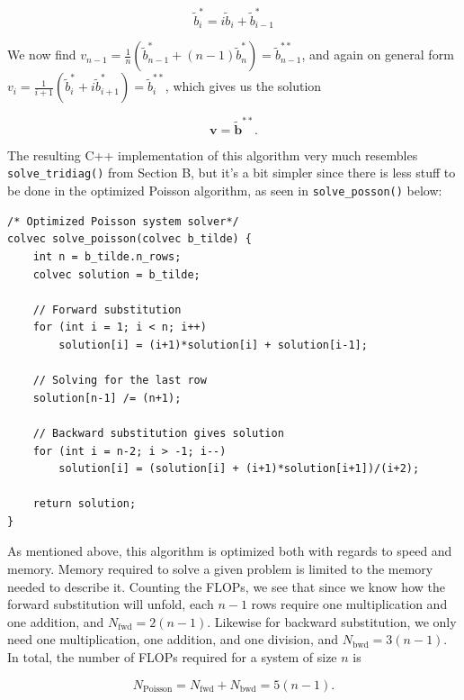 \documentclass[]{article}
\begin{document}
\begin{equation*}
\tilde{b}_{i}^{\ast} = i\tilde{b}_{i} + \tilde{b}_{i-1}^{\ast}
\end{equation*}

We now find $v_{n-1} = \frac{1}{n}(\tilde{b}_{n-1}^{\ast} + (n-1)\tilde{b}_{n}^{\ast}) = \tilde{b}_{n-1}^{\ast\ast}$, and again on general form $v_i = \frac{1}{i+1}(\tilde{b}_{i}^{\ast} + i\tilde{b}_{i+1}^{\ast}) = \tilde{b}_{i}^{\ast\ast}$, which gives us the solution

\begin{equation*}
\mathbf{v} = \mathbf{\tilde{b}^{\ast\ast}}\text{.}
\end{equation*}

The resulting C++ implementation of this algorithm very much resembles \lstinline|solve_tridiag()| from Section B, but it's a bit simpler since there is less stuff to be done in the optimized Poisson algorithm, as seen in \lstinline|solve_posson()| below:

\begin{lstlisting}
/* Optimized Poisson system solver*/
colvec solve_poisson(colvec b_tilde) {
	int n = b_tilde.n_rows;
	colvec solution = b_tilde;
	
	// Forward substitution
	for (int i = 1; i < n; i++)
		solution[i] = (i+1)*solution[i] + solution[i-1];
	
	// Solving for the last row
	solution[n-1] /= (n+1);
	
	// Backward substitution gives solution
	for (int i = n-2; i > -1; i--)
		solution[i] = (solution[i] + (i+1)*solution[i+1])/(i+2);
	
	return solution;
}
\end{lstlisting}

As mentioned above, this algorithm is optimized both with regards to speed and memory. Memory required to solve a given problem is limited to the memory needed to describe it. Counting the FLOPs, we see that since we know how the forward substitution will unfold, each $n-1$ rows require one multiplication and one addition, and $N_{\text{fwd}} = 2(n-1)$. Likewise for backward substitution, we only need one multiplication, one addition, and one division, and $N_{\text{bwd}} = 3(n-1)$. In total, the number of FLOPs required for a system of size $n$ is

\begin{equation*}
N_{\text{Poisson}} = N_{\text{fwd}} + N_{\text{bwd}} = 5(n-1).
\end{equation*}
\end{document}
